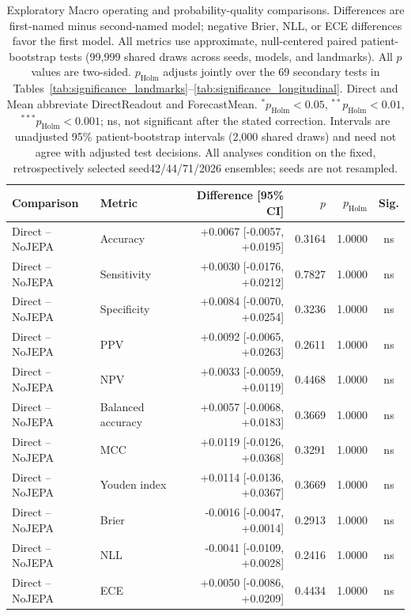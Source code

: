 \begin{table}[t]
\centering
\small
\caption{Exploratory Macro operating and probability-quality comparisons. Differences are first-named minus second-named model; negative Brier, NLL, or ECE differences favor the first model. All metrics use approximate, null-centered paired patient-bootstrap tests (99,999 shared draws across seeds, models, and landmarks). All $p$ values are two-sided. $p_{\mathrm{Holm}}$ adjusts jointly over the 69 secondary tests in Tables~\ref{tab:significance_landmarks}--\ref{tab:significance_longitudinal}. Direct and Mean abbreviate DirectReadout and ForecastMean. $^{*}p_{\mathrm{Holm}}<0.05$, $^{**}p_{\mathrm{Holm}}<0.01$, $^{***}p_{\mathrm{Holm}}<0.001$; ns, not significant after the stated correction. Intervals are unadjusted 95\% patient-bootstrap intervals (2,000 shared draws) and need not agree with adjusted test decisions. All analyses condition on the fixed, retrospectively selected seed42/44/71/2026 ensembles; seeds are not resampled.}
\label{tab:significance_extended}
\begin{tabular}{llrrrc}
\toprule
Comparison & Metric & Difference [95\% CI] & $p$ & $p_{\mathrm{Holm}}$ & Sig. \\
\midrule
Direct -- NoJEPA & Accuracy & +0.0067 [-0.0057, +0.0195] & 0.3164 & 1.0000 & ns \\
Direct -- NoJEPA & Sensitivity & +0.0030 [-0.0176, +0.0212] & 0.7827 & 1.0000 & ns \\
Direct -- NoJEPA & Specificity & +0.0084 [-0.0070, +0.0254] & 0.3236 & 1.0000 & ns \\
Direct -- NoJEPA & PPV & +0.0092 [-0.0065, +0.0263] & 0.2611 & 1.0000 & ns \\
Direct -- NoJEPA & NPV & +0.0033 [-0.0059, +0.0119] & 0.4468 & 1.0000 & ns \\
Direct -- NoJEPA & Balanced accuracy & +0.0057 [-0.0068, +0.0183] & 0.3669 & 1.0000 & ns \\
Direct -- NoJEPA & MCC & +0.0119 [-0.0126, +0.0368] & 0.3291 & 1.0000 & ns \\
Direct -- NoJEPA & Youden index & +0.0114 [-0.0136, +0.0367] & 0.3669 & 1.0000 & ns \\
Direct -- NoJEPA & Brier & -0.0016 [-0.0047, +0.0014] & 0.2913 & 1.0000 & ns \\
Direct -- NoJEPA & NLL & -0.0041 [-0.0109, +0.0028] & 0.2416 & 1.0000 & ns \\
Direct -- NoJEPA & ECE & +0.0050 [-0.0086, +0.0209] & 0.4434 & 1.0000 & ns \\

\end{tabular}
\end{table}
